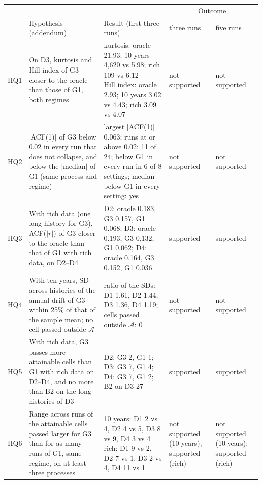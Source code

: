 \begin{tabular}{lllll}
\toprule
& & & \multicolumn{2}{c}{Outcome} \\
\cmidrule(lr){4-5}
& Hypothesis (addendum) & Result (first three runs) & three runs & five runs \\
\midrule
HQ1 & \parbox[t]{4.0cm}{\raggedright On D3, kurtosis and Hill index of G3 closer to the oracle than those of G1, both regimes\strut} & \parbox[t]{5.8cm}{\raggedright kurtosis: oracle 21.93; 10 years 4{,}620 vs 5.98; rich 109 vs 6.12 \newline Hill index: oracle 2.93; 10 years 3.02 vs 4.43; rich 3.09 vs 4.07\strut} & \parbox[t]{1.6cm}{\raggedright not supported\strut} & \parbox[t]{1.6cm}{\raggedright not supported\strut} \\
\addlinespace
HQ2 & \parbox[t]{4.0cm}{\raggedright $|$ACF(1)$|$ of G3 below 0.02 in every run that does not collapse, and below the $|$median$|$ of G1 (same process and regime)\strut} & \parbox[t]{5.8cm}{\raggedright largest $|$ACF(1)$|$ 0.063; runs at or above 0.02: 11 of 24; below G1 in every run in 6 of 8 settings; median below G1 in every setting: yes\strut} & \parbox[t]{1.6cm}{\raggedright not supported\strut} & \parbox[t]{1.6cm}{\raggedright not supported\strut} \\
\addlinespace
HQ3 & \parbox[t]{4.0cm}{\raggedright With rich data (one long history for G3), ACF($|r|$) of G3 closer to the oracle than that of G1 with rich data, on D2--D4\strut} & \parbox[t]{5.8cm}{\raggedright D2: oracle 0.183, G3 0.157, G1 0.068; D3: oracle 0.193, G3 0.132, G1 0.062; D4: oracle 0.164, G3 0.152, G1 0.036\strut} & \parbox[t]{1.6cm}{\raggedright supported\strut} & \parbox[t]{1.6cm}{\raggedright supported\strut} \\
\addlinespace
HQ4 & \parbox[t]{4.0cm}{\raggedright With ten years, SD across histories of the annual drift of G3 within 25\% of that of the sample mean; no cell passed outside $\mathcal{A}$\strut} & \parbox[t]{5.8cm}{\raggedright ratio of the SDs: D1 1.61, D2 1.44, D3 1.36, D4 1.19; cells passed outside $\mathcal{A}$: 0\strut} & \parbox[t]{1.6cm}{\raggedright not supported\strut} & \parbox[t]{1.6cm}{\raggedright not supported\strut} \\
\addlinespace
HQ5 & \parbox[t]{4.0cm}{\raggedright With rich data, G3 passes more attainable cells than G1 with rich data on D2--D4, and no more than B2 on the long histories of D3\strut} & \parbox[t]{5.8cm}{\raggedright D2: G3 2, G1 1; D3: G3 7, G1 4; D4: G3 7, G1 2; B2 on D3 27\strut} & \parbox[t]{1.6cm}{\raggedright supported\strut} & \parbox[t]{1.6cm}{\raggedright supported\strut} \\
\addlinespace
HQ6 & \parbox[t]{4.0cm}{\raggedright Range across runs of the attainable cells passed larger for G3 than for as many runs of G1, same regime, on at least three processes\strut} & \parbox[t]{5.8cm}{\raggedright 10 years: D1 2 vs 4, D2 4 vs 5, D3 8 vs 9, D4 3 vs 4 \newline rich: D1 9 vs 2, D2 7 vs 1, D3 2 vs 4, D4 11 vs 1\strut} & \parbox[t]{1.6cm}{\raggedright not supported (10 years); supported (rich)\strut} & \parbox[t]{1.6cm}{\raggedright not supported (10 years); supported (rich)\strut} \\
\bottomrule
\end{tabular}
